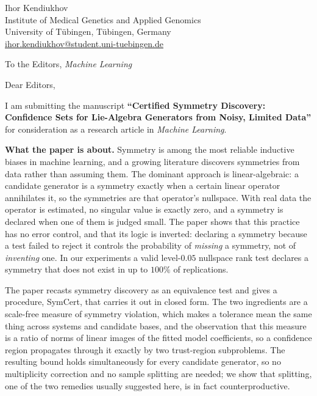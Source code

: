 \documentclass[11pt,a4paper]{article}
\begin{document}
\begin{flushright}
Ihor Kendiukhov\\
Institute of Medical Genetics and Applied Genomics\\
University of T\"ubingen, T\"ubingen, Germany\\
\href{mailto:ihor.kendiukhov@student.uni-tuebingen.de}{ihor.kendiukhov@student.uni-tuebingen.de}
\end{flushright}

\vspace{1em}

To the Editors, \emph{Machine Learning}

\vspace{0.5em}

Dear Editors,

I am submitting the manuscript \textbf{``Certified Symmetry Discovery:
Confidence Sets for Lie-Algebra Generators from Noisy, Limited Data''} for
consideration as a research article in \emph{Machine Learning}.

\textbf{What the paper is about.} Symmetry is among the most reliable inductive
biases in machine learning, and a growing literature discovers symmetries from
data rather than assuming them. The dominant approach is linear-algebraic: a
candidate generator is a symmetry exactly when a certain linear operator
annihilates it, so the symmetries are that operator's nullspace. With real data
the operator is estimated, no singular value is exactly zero, and a symmetry is
declared when one of them is judged small. The paper shows that this practice
has no error control, and that its logic is inverted: declaring a symmetry
because a test failed to reject it controls the probability of \emph{missing} a
symmetry, not of \emph{inventing} one. In our experiments a valid level-$0.05$
nullspace rank test declares a symmetry that does not exist in up to $100\%$ of
replications.

The paper recasts symmetry discovery as an equivalence test and gives a
procedure, SymCert, that carries it out in closed form. The two ingredients are
a scale-free measure of symmetry violation, which makes a tolerance mean the
same thing across systems and candidate bases, and the observation that this
measure is a ratio of norms of linear images of the fitted model coefficients,
so a confidence region propagates through it exactly by two trust-region
subproblems. The resulting bound holds simultaneously for every candidate
generator, so no multiplicity correction and no sample splitting are needed; we
show that splitting, one of the two remedies usually suggested here, is in fact
counterproductive.
\end{document}
